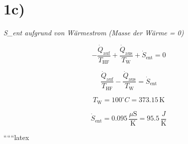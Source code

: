 

\section*{1c)}

\textit{S\_ent aufgrund von Wärmestrom (Masse der Wärme = 0)}

\[
-\frac{\dot{Q}_{\text{auf}}}{T_{\text{HF}}} + \frac{\dot{Q}_{\text{aus}}}{T_{\text{W}}} + \dot{S}_{\text{ent}} = 0
\]

\[
\frac{\dot{Q}_{\text{auf}}}{T_{\text{HF}}} - \frac{\dot{Q}_{\text{aus}}}{T_{\text{W}}} = \dot{S}_{\text{ent}}
\]

\[
T_{\text{W}} = 100^\circ C = 373.15 \, \text{K}
\]

\[
\dot{S}_{\text{ent}} = 0.095 \, \frac{\mu \text{S}}{\text{K}} = 95.5 \, \frac{J}{\text{K}}
\]

``````latex